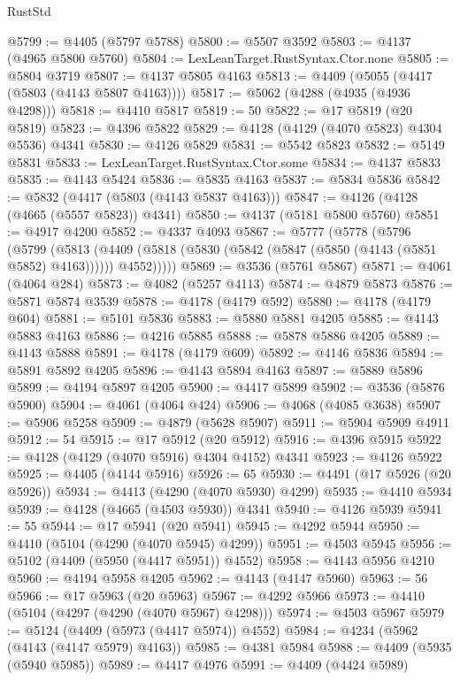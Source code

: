 \begin{lexlean}{RustStd}
\begin{coremodule}
@5799 := @4405 (@5797 @5788)
@5800 := @5507 @3592
@5803 := @4137 (@4965 @5800 @5760)
@5804 := LexLeanTarget.RustSyntax.Ctor.none
@5805 := @5804 @3719
@5807 := @4137 @5805 @4163
@5813 := @4409 (@5055 (@4417 (@5803 (@4143 @5807 @4163))))
@5817 := @5062 (@4288 (@4935 (@4936 @4298)))
@5818 := @4410 @5817
@5819 := 50
@5822 := @17 @5819 (@20 @5819)
@5823 := @4396 @5822
@5829 := @4128 (@4129 (@4070 @5823) @4304 @5536) @4341
@5830 := @4126 @5829
@5831 := @5542 @5823
@5832 := @5149 @5831
@5833 := LexLeanTarget.RustSyntax.Ctor.some
@5834 := @4137 @5833
@5835 := @4143 @5424
@5836 := @5835 @4163
@5837 := @5834 @5836
@5842 := @5832 (@4417 (@5803 (@4143 @5837 @4163)))
@5847 := @4126 (@4128 (@4665 (@5557 @5823)) @4341)
@5850 := @4137 (@5181 @5800 @5760)
@5851 := @4917 @4200
@5852 := @4337 @4093
@5867 := @5777
    (@5778
      (@5796
        (@5799
          (@5813
            (@4409 (@5818 (@5830 (@5842 (@5847 (@5850 (@4143 (@5851 @5852) @4163)))))) @4552)))))
@5869 := @3536 (@5761 @5867)
@5871 := @4061 (@4064 @284)
@5873 := @4082 (@5257 @4113)
@5874 := @4879 @5873
@5876 := @5871 @5874 @3539
@5878 := @4178 (@4179 @592)
@5880 := @4178 (@4179 @604)
@5881 := @5101 @5836
@5883 := @5880 @5881 @4205
@5885 := @4143 @5883 @4163
@5886 := @4216 @5885
@5888 := @5878 @5886 @4205
@5889 := @4143 @5888
@5891 := @4178 (@4179 @609)
@5892 := @4146 @5836
@5894 := @5891 @5892 @4205
@5896 := @4143 @5894 @4163
@5897 := @5889 @5896
@5899 := @4194 @5897 @4205
@5900 := @4417 @5899
@5902 := @3536 (@5876 @5900)
@5904 := @4061 (@4064 @424)
@5906 := @4068 (@4085 @3638)
@5907 := @5906 @5258
@5909 := @4879 (@5628 @5907)
@5911 := @5904 @5909 @4911
@5912 := 54
@5915 := @17 @5912 (@20 @5912)
@5916 := @4396 @5915
@5922 := @4128 (@4129 (@4070 @5916) @4304 @4152) @4341
@5923 := @4126 @5922
@5925 := @4405 (@4144 @5916)
@5926 := 65
@5930 := @4491 (@17 @5926 (@20 @5926))
@5934 := @4413 (@4290 (@4070 @5930) @4299)
@5935 := @4410 @5934
@5939 := @4128 (@4665 (@4503 @5930)) @4341
@5940 := @4126 @5939
@5941 := 55
@5944 := @17 @5941 (@20 @5941)
@5945 := @4292 @5944
@5950 := @4410 (@5104 (@4290 (@4070 @5945) @4299))
@5951 := @4503 @5945
@5956 := @5102 (@4409 (@5950 (@4417 @5951)) @4552)
@5958 := @4143 @5956 @4210
@5960 := @4194 @5958 @4205
@5962 := @4143 (@4147 @5960)
@5963 := 56
@5966 := @17 @5963 (@20 @5963)
@5967 := @4292 @5966
@5973 := @4410 (@5104 (@4297 (@4290 (@4070 @5967) @4298)))
@5974 := @4503 @5967
@5979 := @5124 (@4409 (@5973 (@4417 @5974)) @4552)
@5984 := @4234 (@5962 (@4143 (@4147 @5979) @4163))
@5985 := @4381 @5984
@5988 := @4409 (@5935 (@5940 @5985))
@5989 := @4417 @4976
@5991 := @4409 (@4424 @5989)

\end{coremodule}
\end{lexlean}
